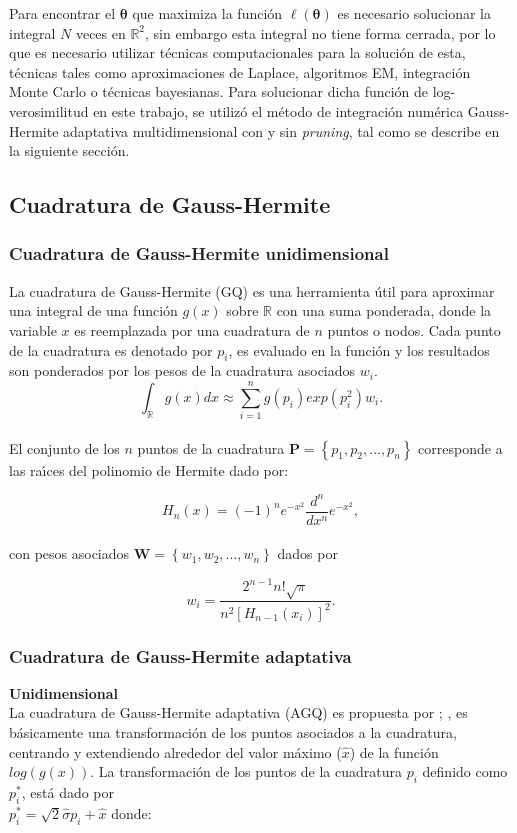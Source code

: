 Para encontrar el $\boldsymbol{\theta}$ que maximiza la funci\'{o}n $\ell(\boldsymbol{\theta})$ es necesario solucionar la integral $N$ veces en $\mathbb{R}^2$, sin embargo esta integral no tiene forma cerrada, por lo que es necesario utilizar t\'{e}cnicas computacionales para la soluci\'{o}n de esta, t\'{e}cnicas tales como aproximaciones de Laplace, algoritmos EM, integraci\'{o}n Monte Carlo o t\'{e}cnicas bayesianas. Para solucionar dicha funci\'{o}n de log-verosimilitud en este trabajo, se utiliz\'{o} el m\'{e}todo de integraci\'{o}n num\'{e}rica Gauss-Hermite adaptativa multidimensional con y sin \textit{pruning}, tal como se describe en la siguiente secci\'{o}n.


\subsection{Cuadratura de Gauss-Hermite}\label{sec:Cuadratura}

\subsubsection{Cuadratura de Gauss-Hermite unidimensional}

La cuadratura de Gauss-Hermite (GQ) es una herramienta \'{u}til para aproximar una integral de una funci\'{o}n $g(x)$ sobre $\mathbb{R}$ con una suma ponderada, donde la variable $x$ es reemplazada por una cuadratura de $n$ puntos o nodos. Cada punto de la cuadratura es denotado por $p_i$, es evaluado en la funci\'{o}n y los resultados son ponderados por los pesos de la cuadratura asociados $w_i$.
\[
\int_{\mathbb{R}}{g(x)dx}\approx\sum_{i=1}^{n}{g(p_i)exp(p_i^2)w_i.}
\]
\\
El conjunto de los $n$ puntos de la cuadratura $\textbf{P}=\left\{p_1,p_2,\ldots,p_n\right\}$ corresponde a las ra\'{\i}ces del polinomio de Hermite dado por:

\[
H_n{(x)}=(-1)^ne^{-x^2}\frac{d^n}{dx^n}e^{-x^2},
\]
\\
con pesos asociados $\textbf{W}=\left\{w_1,w_2,\ldots,w_n\right\}$ dados por

\[
w_i=\frac{2^{n-1}n!\sqrt{\pi}}{n^2{[H_{n-1}(x_i)]}^2}.
\]

\subsubsection{Cuadratura de Gauss-Hermite adaptativa}

\textbf{Unidimensional\\}
La cuadratura de Gauss-Hermite adaptativa (AGQ) es propuesta por \cite{Liu1}; \citep{Pinheiro1}, es b\'{a}sicamente una transformaci\'{o}n de los puntos asociados a la cuadratura, centrando y extendiendo alrededor del valor m\'{a}ximo ($\hat{x}$) de la funci\'{o}n $log(g(x))$. La transformaci\'{o}n de los puntos de la cuadratura $p_i$ definido como $p_i^*$, est\'{a} dado por \\
$p_i^*=\sqrt{2}\hat{\sigma}p_i+\hat{x}$ donde:

